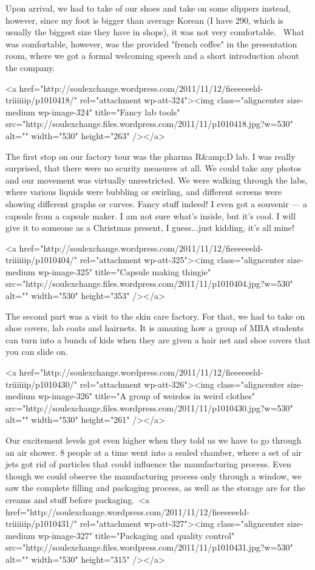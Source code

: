 \begin{post}
\begin{content}
Upon arrival, we had to take of our shoes and take on some slippers instead, however, since my foot is bigger than average Korean (I have 290, which is usually the biggest size they have in shops), it was not very comfortable.  What was comfortable, however, was the provided "french coffee" in the presentation room, where we got a formal welcoming speech and a short introduction about the company.

<a href="http://soulexchange.wordpress.com/2011/11/12/fieeeeeeld-triiiiiip/p1010418/" rel="attachment wp-att-324"><img class="aligncenter size-medium wp-image-324" title="Fancy lab tools" src="http://soulexchange.files.wordpress.com/2011/11/p1010418.jpg?w=530" alt="" width="530" height="263" /></a>

The first stop on our factory tour was the pharma R&amp;D lab. I was really surprised, that there were no scurity measures at all. We could take any photos and our movement was virtually unrestricted. We were walking through the labs, where various liquids were bubbling or swirling, and different screens were showing different graphs or curves. Fancy stuff indeed! I even got a souvenir — a capsule from a capsule maker. I am not sure what's inside, but it's cool. I will give it to someone as a Christmas present, I guess...just kidding, it's all mine!

<a href="http://soulexchange.wordpress.com/2011/11/12/fieeeeeeld-triiiiiip/p1010404/" rel="attachment wp-att-325"><img class="aligncenter size-medium wp-image-325" title="Capsule making thingie" src="http://soulexchange.files.wordpress.com/2011/11/p1010404.jpg?w=530" alt="" width="530" height="353" /></a>

The second part was a visit to the skin care factory. For that, we had to take on shoe covers, lab coats and hairnets. It is amazing how a group of MBA students can turn into a bunch of kids when they are given a hair net and shoe covers that you can slide on.

<a href="http://soulexchange.wordpress.com/2011/11/12/fieeeeeeld-triiiiiip/p1010430/" rel="attachment wp-att-326"><img class="aligncenter size-medium wp-image-326" title="A group of weirdos in weird clothes" src="http://soulexchange.files.wordpress.com/2011/11/p1010430.jpg?w=530" alt="" width="530" height="261" /></a>

Our excitement levels got even higher when they told us we have to go through an air shower. 8 people at a time went into a sealed chamber, where a set of air jets got rid of particles that could influence the manufacturing process. Even though we could observe the manufacturing process only through a window, we saw the complete filling and packaging process, as well as the storage are for the creams and stuff before packaging. <a href="http://soulexchange.wordpress.com/2011/11/12/fieeeeeeld-triiiiiip/p1010431/" rel="attachment wp-att-327"><img class="aligncenter size-medium wp-image-327" title="Packaging and quality control" src="http://soulexchange.files.wordpress.com/2011/11/p1010431.jpg?w=530" alt="" width="530" height="315" /></a>


\end{content}
\end{post}
